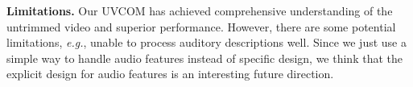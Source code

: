 \noindent \textbf{Limitations.} Our UVCOM has achieved comprehensive understanding of the untrimmed video and superior performance.
However, there are some potential limitations, \textit{e.g.}, unable to process auditory descriptions well.
Since we just use a simple way to handle audio features instead of specific design, we think that the explicit design for audio features is an interesting future direction.

{
    \small
        }
\clearpage
\setcounter{page}{1}

